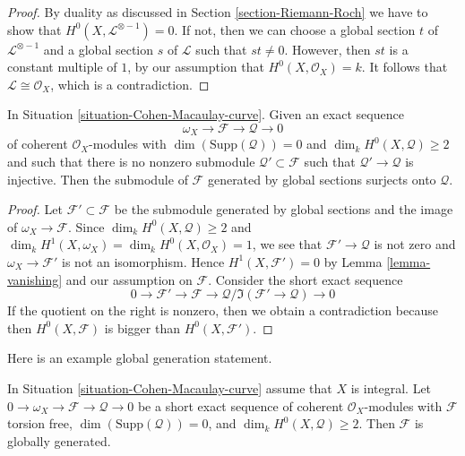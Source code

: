 \begin{proof}
By duality as discussed in Section \ref{section-Riemann-Roch} we have to
show that $H^0(X, \mathcal{L}^{\otimes - 1}) = 0$. If not, then we can
choose a global section $t$ of $\mathcal{L}^{\otimes - 1}$
and a global section $s$ of $\mathcal{L}$ such that $st \not = 0$.
However, then $st$ is a constant multiple of $1$, by our assumption
that $H^0(X, \mathcal{O}_X) = k$. It follows that
$\mathcal{L} \cong \mathcal{O}_X$, which is a contradiction.
\end{proof}

\begin{lemma}
\label{lemma-globally-generated}
In Situation \ref{situation-Cohen-Macaulay-curve}. Given an exact sequence
$$
\omega_X \to \mathcal{F} \to \mathcal{Q} \to 0
$$
of coherent $\mathcal{O}_X$-modules with $\dim(\text{Supp}(\mathcal{Q})) = 0$
and $\dim_k H^0(X, \mathcal{Q}) \geq 2$ and such that there is no nonzero
submodule $\mathcal{Q}' \subset \mathcal{F}$ such that
$\mathcal{Q}' \to \mathcal{Q}$ is injective.
Then the submodule of $\mathcal{F}$ generated by global
sections surjects onto $\mathcal{Q}$.
\end{lemma}

\begin{proof}
Let $\mathcal{F}' \subset \mathcal{F}$ be the submodule generated by
global sections and the image of $\omega_X \to \mathcal{F}$. Since
$\dim_k H^0(X, \mathcal{Q}) \geq 2$ and
$\dim_k H^1(X, \omega_X) = \dim_k H^0(X, \mathcal{O}_X) = 1$,
we see that $\mathcal{F}' \to \mathcal{Q}$ is not zero and
$\omega_X \to \mathcal{F}'$ is not an isomorphism.
Hence $H^1(X, \mathcal{F}') = 0$ by Lemma \ref{lemma-vanishing}
and our assumption on $\mathcal{F}$.
Consider the short exact sequence
$$
0 \to \mathcal{F}' \to \mathcal{F} \to
\mathcal{Q}/\Im(\mathcal{F}' \to \mathcal{Q}) \to 0
$$
If the quotient on the right is nonzero, then we obtain a contradiction
because then $H^0(X, \mathcal{F})$ is bigger than $H^0(X, \mathcal{F}')$.
\end{proof}

\noindent
Here is an example global generation statement.

\begin{lemma}
\label{lemma-globally-generated-curve}
In Situation \ref{situation-Cohen-Macaulay-curve} assume that
$X$ is integral. Let $0 \to \omega_X \to \mathcal{F} \to \mathcal{Q} \to 0$
be a short exact sequence of coherent $\mathcal{O}_X$-modules with
$\mathcal{F}$ torsion free, $\dim(\text{Supp}(\mathcal{Q})) = 0$,
and $\dim_k H^0(X, \mathcal{Q}) \geq 2$. Then $\mathcal{F}$
is globally generated.
\end{lemma}


